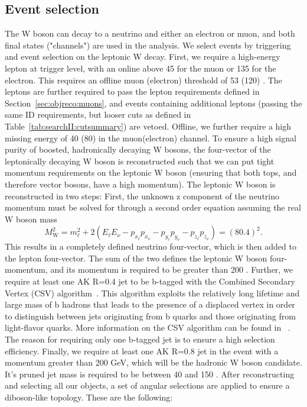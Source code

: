 \subsection{Event selection}
\label{sec:searchI:vtag:evsel}
The W boson can decay to a neutrino and either an electron or muon, and both final states ("channels") are used in the analysis. We select events by triggering and event selection on the leptonic W decay. First, we require a high-energy lepton at trigger level, with an online \PT above 45 \GeV for the muon or 135 \GeV for the electron. This requires an offline muon (electron) \PT threshold of 53 (120) \GeV. The leptons are further required to pass the lepton requirements defined in Section~\ref{sec:objreco:muons}, and events containing additional leptons (passing the same ID requirements, but looser cuts as defined in Table~\ref{tab:searchII:cutsummary}) are vetoed. Offline, we further require a high missing energy of 40 (80) \GeV in the muon(electron) channel. To ensure a high signal purity of boosted, hadronically decaying W bosons, the four-vector of the leptonically decaying W boson is reconstructed such that we can put tight momentum requirements on the leptonic W boson (ensuring that both tops, and therefore vector bosons, have a high momentum). The leptonic W boson is reconstructed in two steps: First, the unknown z component of the neutrino momentum must be solved for through a second order equation assuming the real W boson mass
\begin{equation*}
M_\mathrm{W}^2 = m_\ell^2   + 2(E_\ell E_\nu - p_{x_\ell}p_{x_\nu} - p_{y_\ell}p_{y_\nu} - p_{z_\ell}p_{z_\nu} ) = (80.4)^2.  
\end{equation*}
This results in a completely defined neutrino four-vector, which is then added to the lepton four-vector. The sum of the two defines the leptonic W boson four-momentum, and its momentum is required to be greater than 200 \GeV. Further, we require at least one AK R=0.4 jet to be b-tagged with the Combined Secondary Vertex (CSV) algorithm~\cite{1748-0221-8-04-P04013,1748-0221-13-05-P05011}. This algorithm exploits the relatively long lifetime and large mass of b hadrons that leads to the presence of a displaced vertex in order to distinguish between jets originating from b quarks and those originating from light-flavor quarks. More information on the CSV algorithm can be found in ~\cite{1748-0221-8-04-P04013,1748-0221-13-05-P05011}. The reason for requiring only one b-tagged jet is to ensure a high selection efficiency. Finally, we require at least one AK R=0.8 jet in the event with a momentum greater than 200 GeV, which will be the hadronic W boson candidate. It's pruned jet mass is required to be between 40 \GeV and 150 \GeV. After reconstructing and selecting all our objects, a set of angular selections are applied to ensure a diboson-like topology. These are the following:
